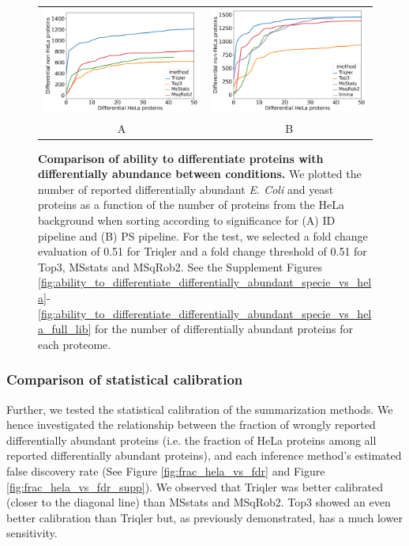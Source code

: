 \documentclass[10pt,letterpaper]{article}
\begin{document}
\begin{figure}[hbt]
    \centering
    \begin{tabular}{cc} 
        \includegraphics[width=0.45\linewidth]{./img/diff_HeLa_vs_nonHeLa_ID_all_0.51.png} & 
        \includegraphics[width=0.45\linewidth]{./img/diff_HeLa_vs_nonHeLa_PS_all_0.51_Limma.png}\\
        A & B 
    \end{tabular} 
    \caption{{\bf Comparison of ability to differentiate proteins with differentially abundance between conditions.} We plotted the number of reported differentially abundant  {\em E. Coli} and yeast proteins as a function of the number of proteins from the HeLa background when sorting according to significance for (A) ID pipeline and (B) PS pipeline. For the test, we selected a fold change evaluation of 0.51 for Triqler and a fold change threshold of 0.51 for Top3, MSstats and MSqRob2. See the Supplement Figures \ref{fig:ability_to_differentiate_differentially_abundant_specie_vs_hela}-\ref{fig:ability_to_differentiate_differentially_abundant_specie_vs_hela_full_lib} for the number of differentially abundant proteins for each proteome. \label{fig:diff_vs_hela}}
\end{figure}

\subsubsection*{Comparison of statistical calibration}

Further, we tested the statistical calibration of the summarization methods. We hence investigated the relationship between the fraction of wrongly reported differentially abundant proteins (i.e. the fraction of HeLa proteins among all reported differentially abundant proteins), and each inference method's estimated false discovery rate (See Figure \ref{fig:frac_hela_vs_fdr} and Figure \ref{fig:frac_hela_vs_fdr_supp}). We observed that Triqler was better calibrated (closer to the diagonal line) than MSstats and MSqRob2. Top3 showed an even better calibration than Triqler but, as previously demonstrated, has a much lower sensitivity.
\end{document}
